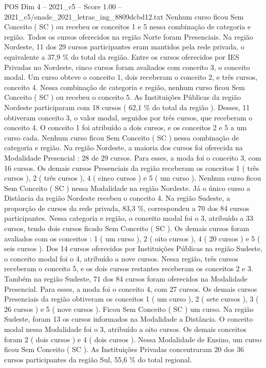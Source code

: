 \begin{textsample}{POS Dim 4 – 2021\_c5 – Score 1.00 – 2021\_c5/enade\_2021\_letras\_ing\_8809dcbd12.txt}
Nenhum curso ficou Sem Conceito ( SC ) ou recebeu os conceitos 1 e 5 nessa combinação de categoria e região.
Todos os cursos oferecidos na região Norte foram Presenciais.
Na região Nordeste, 11 dos 29 cursos participantes eram mantidos pela rede privada, o equivalente a 37,9 \% do total da região.
Entre os cursos oferecidos por IES Privadas no Nordeste, cinco cursos foram avaliados com conceito 3, o conceito modal.
Um curso obteve o conceito 1, dois receberam o conceito 2, e três cursos, conceito 4.
Nessa combinação de categoria e região, nenhum curso ficou Sem Conceito ( SC ) ou recebeu o conceito 5.
As Instituições Públicas da região Nordeste participaram com 18 cursos ( 62,1 \% do total da região ).
Desses, 11 obtiveram conceito 3, o valor modal, seguidos por três cursos, que receberam o conceito 4.
O conceito 1 foi atribuído a dois cursos, e os conceitos 2 e 5 a um curso cada.
Nenhum curso ficou Sem Conceito ( SC ) nessa combinação de categoria e região.
Na região Nordeste, a maioria dos cursos foi oferecida na Modalidade Presencial : 28 de 29 cursos.
Para esses, a moda foi o conceito 3, com 16 cursos.
Os demais cursos Presenciais da região receberam os conceitos 1 ( três cursos ), 2 ( três cursos ), 4 ( cinco cursos ) e 5 ( um curso ).
Nenhum curso ficou Sem Conceito ( SC ) nessa Modalidade na região Nordeste.
Já o único curso a Distância da região Nordeste recebeu o conceito 4.
Na região Sudeste, a proporção de cursos da rede privada, 83,3 \%, correspondeu a 70 dos 84 cursos participantes.
Nessa categoria e região, o conceito modal foi o 3, atribuído a 33 cursos, tendo dois cursos ficado Sem Conceito ( SC ).
Os demais cursos foram avaliados com os conceitos : 1 ( um curso ), 2 ( oito cursos ), 4 ( 20 cursos ) e 5 ( seis cursos ).
Dos 14 cursos oferecidos por Instituições Públicas na região Sudeste, o conceito modal foi o 4, atribuído a nove cursos.
Nessa região, três cursos receberam o conceito 5, e os dois cursos restantes receberam os conceitos 2 e 3.
Também na região Sudeste, 71 dos 84 cursos foram oferecidos na Modalidade Presencial.
Para esses, a moda foi o conceito 4, com 27 cursos.
Os demais cursos Presenciais da região obtiveram os conceitos 1 ( um curso ), 2 ( sete cursos ), 3 ( 26 cursos ) e 5 ( nove cursos ).
Ficou Sem Conceito ( SC ) um curso.
Na região Sudeste, foram 13 os cursos informados na Modalidade a Distância.
O conceito modal nessa Modalidade foi o 3, atribuído a oito cursos.
Os demais conceitos foram 2 ( dois cursos ) e 4 ( dois cursos ).
Nessa Modalidade de Ensino, um curso ficou Sem Conceito ( SC ).
As Instituições Privadas concentraram 20 dos 36 cursos participantes da região Sul, 55,6 \% do total regional.

\end{textsample}
